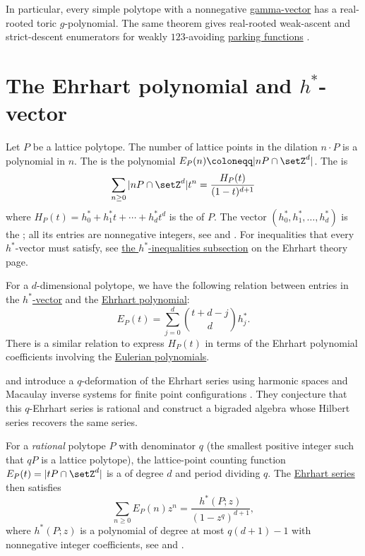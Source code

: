 In particular, every simple polytope with a nonnegative
\hyperref[gammaPolynomial]{gamma-vector} has a real-rooted toric
$g$-polynomial.  The same theorem gives real-rooted weak-ascent and
strict-descent enumerators for weakly $123$-avoiding
\hyperref[parkingFunctionDescentsRealRooted]{parking functions}
\cite[Cor.~8.4]{Alexandersson2026ParkingSmirnov}.



\section[ehrhartPolytopes]{The Ehrhart polynomial and $h^*$-vector}

Let $P$ be a lattice polytope.  The number of lattice points in the dilation
$n\cdot P$ is a polynomial in $n$.
The \label{ehrhartPolynomialDefinition}
is the polynomial
$E_P(n) \coloneqq |n P \cap \setZ^d|$.
The \label{ehrhartSeries} is
\[
\sum_{n \geq 0} |nP \cap \setZ^d| t^n = \frac{H_P(t)}{(1-t)^{d+1}}
\]
where $H_P(t) = h^*_0 + h^*_1 t + \dotsb + h^*_d t^d$ is the
\label{hStarPolynomial} of $P$.
The vector $(h^*_0 , h^*_1, \dotsc,  h^*_d )$ is the
\label{hStarVector}; all its entries are nonnegative
integers, see \cite{Stanley1993} and \cite{Beck2007}.
For inequalities that every \(h^*\)-vector must satisfy, see
\hyperref[hStarInequalities]{the \(h^*\)-inequalities subsection} on the
Ehrhart theory page.

For a $d$-dimensional polytope, we have the following relation between
entries in the \hyperref[hStarVector]{$h^*$-vector} and the
\hyperref[ehrhartPolynomialDefinition]{Ehrhart polynomial}:
\[
 E_P(t) = \sum_{j=0}^d \binom{t+d-j}{d} h^*_j.
\]
There is a similar relation to express $H_P(t)$ in terms of the
Ehrhart polynomial coefficients involving the \hyperref[eulerianPolynomial]{Eulerian polynomials}.

 and  introduce a $q$-deformation
of the Ehrhart series using harmonic spaces and Macaulay inverse systems for
finite point configurations \cite{ReinerRhoades2024x}.  They conjecture that
this $q$-Ehrhart series is rational and construct a bigraded algebra whose
Hilbert series recovers the same series.


For a \emph{rational} polytope $P$ with denominator $q$
(the smallest positive integer such that $qP$ is a lattice polytope),
the lattice-point counting function $E_P(t) = |tP \cap \setZ^d|$ is a
\label{ehrhartQuasiPolynomial} of degree $d$
and period dividing $q$.
The \hyperref[ehrhartSeries]{Ehrhart series} then satisfies
\[
 \sum_{n \geq 0} E_P(n) z^n = \frac{h^*(P;z)}{(1-z^q)^{d+1}},
\]
where $h^*(P;z)$ is a polynomial of degree at most $q(d+1)-1$
with nonnegative integer coefficients, see \cite{Beck2007} and
\cite{Stanley1993}.

